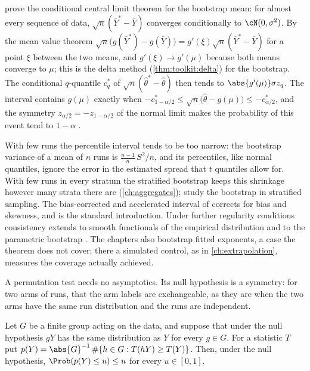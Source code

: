 \begin{refsection}
\begin{proofsketch}
\Textcite{BickelFreedman1981} prove the conditional central limit theorem for the bootstrap mean: for almost every sequence of data, $\sqrt n(\bar Y^*-\bar Y)$ converges conditionally to $\cN(0,\sigma^2)$. By the mean value theorem $\sqrt n\bigl(g(\bar Y^*)-g(\bar Y)\bigr)=g'(\xi)\sqrt n(\bar Y^*-\bar Y)$ for a point $\xi$ between the two means, and $g'(\xi)\to g'(\mu)$ because both means converge to $\mu$; this is the delta method (\cref{thm:toolkit:delta}) for the bootstrap. The conditional $q$-quantile $c^*_q$ of $\sqrt n(\hat\theta^*-\hat\theta)$ then tends to $\abs{g'(\mu)}\sigma z_q$. The interval contains $g(\mu)$ exactly when $-c^*_{1-\alpha/2}\le\sqrt n\bigl(\hat\theta-g(\mu)\bigr)\le-c^*_{\alpha/2}$, and the symmetry $z_{\alpha/2}=-z_{1-\alpha/2}$ of the normal limit makes the probability of this event tend to $1-\alpha$ \parencite[Chapter~23]{vanderVaart1998}.
\end{proofsketch}

With few runs the percentile interval tends to be too narrow: the bootstrap variance of a mean of $n$ runs is $\frac{n-1}n\,S^2/n$, and its percentiles, like normal quantiles, ignore the error in the estimated spread that $t$ quantiles allow for. With few runs in every stratum the stratified bootstrap keeps this shrinkage however many strata there are (\cref{ch:aggregates}); \textcite{BickelFreedman1984} study the bootstrap in stratified sampling. The bias-corrected and accelerated interval of \textcite{Efron1987} corrects for bias and skewness, and \textcite{EfronTibshirani1993} is the standard introduction. Under further regularity conditions consistency extends to smooth functionals of the empirical distribution and to the parametric bootstrap \parencite[Chapter~23]{vanderVaart1998}. The chapters also bootstrap fitted exponents, a case the theorem does not cover; there a simulated control, as in \cref{ch:extrapolation}, measures the coverage actually achieved.

A permutation test needs no asymptotics. Its null hypothesis is a symmetry: for two arms of runs, that the arm labels are exchangeable, as they are when the two arms have the same run distribution and the runs are independent.

\begin{theorem}\label{thm:toolkit:permutation}
Let $G$ be a finite group acting on the data, and suppose that under the null hypothesis $gY$ has the same distribution as $Y$ for every $g\in G$. For a statistic $T$ put $p(Y)=\abs{G}^{-1}\,\#\{h\in G:T(hY)\ge T(Y)\}$. Then, under the null hypothesis, $\Prob(p(Y)\le u)\le u$ for every $u\in[0,1]$.
\end{theorem}


\end{refsection}
